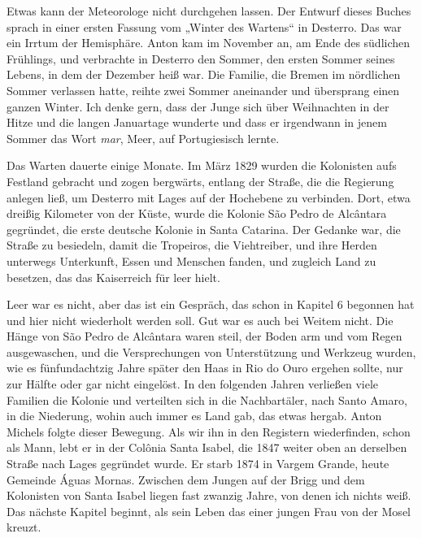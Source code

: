 \documentclass[
  ngerman,
  11pt,
  openany]{book}
\begin{document}
Etwas kann der Meteorologe nicht durchgehen lassen. Der Entwurf dieses
Buches sprach in einer ersten Fassung vom „Winter des Wartens`` in
Desterro. Das war ein Irrtum der Hemisphäre. Anton kam im November an,
am Ende des südlichen Frühlings, und verbrachte in Desterro den Sommer,
den ersten Sommer seines Lebens, in dem der Dezember heiß war. Die
Familie, die Bremen im nördlichen Sommer verlassen hatte, reihte zwei
Sommer aneinander und übersprang einen ganzen Winter. Ich denke gern,
dass der Junge sich über Weihnachten in der Hitze und die langen
Januartage wunderte und dass er irgendwann in jenem Sommer das Wort
\emph{mar}, Meer, auf Portugiesisch lernte.

Das Warten dauerte einige Monate. Im März 1829 wurden die Kolonisten
aufs Festland gebracht und zogen bergwärts, entlang der Straße, die die
Regierung anlegen ließ, um Desterro mit Lages auf der Hochebene zu
verbinden. Dort, etwa dreißig Kilometer von der Küste, wurde die Kolonie
São Pedro de Alcântara gegründet, die erste deutsche Kolonie in Santa
Catarina. Der Gedanke war, die Straße zu besiedeln, damit die Tropeiros,
die Viehtreiber, und ihre Herden unterwegs Unterkunft, Essen und
Menschen fanden, und zugleich Land zu besetzen, das das Kaiserreich für
leer hielt.

Leer war es nicht, aber das ist ein Gespräch, das schon in Kapitel 6
begonnen hat und hier nicht wiederholt werden soll. Gut war es auch bei
Weitem nicht. Die Hänge von São Pedro de Alcântara waren steil, der
Boden arm und vom Regen ausgewaschen, und die Versprechungen von
Unterstützung und Werkzeug wurden, wie es fünfundachtzig Jahre später
den Haas in Rio do Ouro ergehen sollte, nur zur Hälfte oder gar nicht
eingelöst. In den folgenden Jahren verließen viele Familien die Kolonie
und verteilten sich in die Nachbartäler, nach Santo Amaro, in die
Niederung, wohin auch immer es Land gab, das etwas hergab. Anton Michels
folgte dieser Bewegung. Als wir ihn in den Registern wiederfinden, schon
als Mann, lebt er in der Colônia Santa Isabel, die 1847 weiter oben an
derselben Straße nach Lages gegründet wurde. Er starb 1874 in Vargem
Grande, heute Gemeinde Águas Mornas. Zwischen dem Jungen auf der Brigg
und dem Kolonisten von Santa Isabel liegen fast zwanzig Jahre, von denen
ich nichts weiß. Das nächste Kapitel beginnt, als sein Leben das einer
jungen Frau von der Mosel kreuzt.
\end{document}
